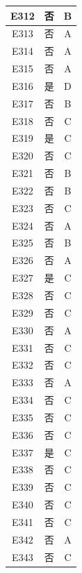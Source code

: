 \documentclass[UTF8]{ctexart}
\begin{document}
\begin{center}
\begin{longtable}{|c|c|c|}
		E312     & 否       & B        \\ \hline
		E313     & 否       & A        \\ \hline
		E314     & 否       & A        \\ \hline
		E315     & 否       & A        \\ \hline
		E316     & 是       & D        \\ \hline
		E317     & 否       & B        \\ \hline
		E318     & 否       & C        \\ \hline
		E319     & 是       & C        \\ \hline
		E320     & 否       & C        \\ \hline
		E321     & 否       & B        \\ \hline
		E322     & 否       & B        \\ \hline
		E323     & 否       & C        \\ \hline
		E324     & 否       & A        \\ \hline
		E325     & 否       & B        \\ \hline
		E326     & 否       & A        \\ \hline
		E327     & 是       & C        \\ \hline
		E328     & 否       & C        \\ \hline
		E329     & 否       & C        \\ \hline
		E330     & 否       & A        \\ \hline
		E331     & 否       & C        \\ \hline
		E332     & 否       & C        \\ \hline
		E333     & 否       & A        \\ \hline
		E334     & 否       & C        \\ \hline
		E335     & 否       & C        \\ \hline
		E336     & 否       & C        \\ \hline
		E337     & 是       & C        \\ \hline
		E338     & 否       & C        \\ \hline
		E339     & 否       & C        \\ \hline
		E340     & 否       & C        \\ \hline
		E341     & 否       & C        \\ \hline
		E342     & 否       & A        \\ \hline
		E343     & 否       & C        \\ \hline

\end{longtable}
\end{center}
\end{document}

